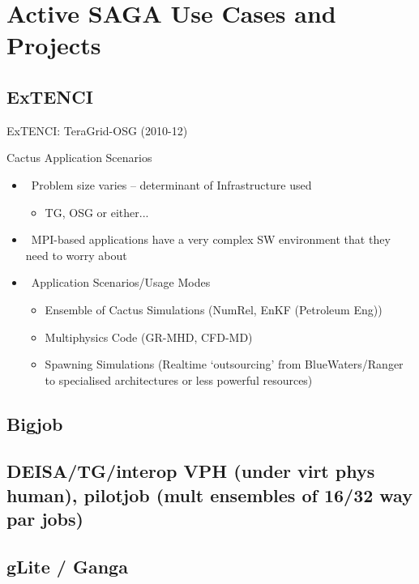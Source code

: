 \documentclass[3p,twocolumn]{article}
\begin{document}
\section{Active SAGA Use Cases and Projects}

 \subsection{ExTENCI}

 ExTENCI: TeraGrid-OSG (2010-12)

 Cactus Application Scenarios
 
 \begin{itemize}

  \item  Problem size varies – determinant of Infrastructure used
         \begin{itemize}
          \item TG, OSG or either...
         \end{itemize}

  \item  MPI-based applications have a very complex SW
         environment that they need to worry about

  \item  Application Scenarios/Usage Modes
         \begin{itemize}
          \item Ensemble of Cactus Simulations
                (NumRel, EnKF (Petroleum Eng))
          \item Multiphysics Code
                (GR-MHD, CFD-MD)
          \item Spawning Simulations
                (Realtime ‘outsourcing’ from BlueWaters/Ranger to 
                 specialised architectures or less powerful resources)
         \end{itemize}

  \end{itemize}

 \subsection{Bigjob}

 \subsection{DEISA/TG/interop VPH (under virt phys human), pilotjob
 (mult ensembles of 16/32 way par jobs)}

 \subsection{gLite / Ganga}
\end{document}
